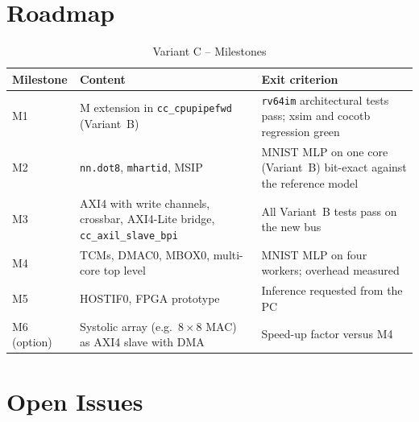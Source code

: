 \section{Roadmap}
\label{sec:mcnnroadmap}

\begin{table}[H]
\caption{Variant C -- Milestones}
\label{tab:mcnnroadmap}
\centering
{\footnotesize
\begin{tabularx}{\textwidth}{|l |X |X|}
  \hline
  Milestone & Content & Exit criterion \\
  \hline
  \hline
  M1 & M extension in \texttt{cc\_cpupipefwd} (Variant~B) & \texttt{rv64im} architectural tests pass; xsim and cocotb regression green \\
  \hline
  M2 & \texttt{nn.dot8}, \texttt{mhartid}, MSIP & MNIST MLP on one core (Variant~B) bit-exact against the reference model \\
  \hline
  M3 & AXI4 with write channels, crossbar, AXI4-Lite bridge, \texttt{cc\_axil\_slave\_bpi} & All Variant~B tests pass on the new bus \\
  \hline
  M4 & TCMs, DMAC0, MBOX0, multi-core top level & MNIST MLP on four workers; overhead measured \\
  \hline
  M5 & HOSTIF0, FPGA prototype & Inference requested from the PC \\
  \hline
  M6 (option) & Systolic array (e.g.\ $8\times8$ MAC) as AXI4 slave with DMA & Speed-up factor versus M4 \\
  \hline
\end{tabularx}}
\end{table}

\section{Open Issues}
\label{sec:mcnnopen}

